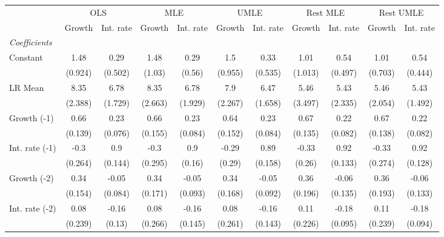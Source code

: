 \begin{table}[htbp] 
	\centering
	\begin{tabular}{@{\extracolsep{4pt}}lcccccccccc@{}}		\hline\hline
		 		 & \multicolumn{2}{c}{OLS} &\multicolumn{2}{c}{MLE} &\multicolumn{2}{c}{UMLE} &\multicolumn{2}{c}{Rest MLE} &\multicolumn{2}{c}{Rest UMLE} \\ 
 		 & Growth 	 & Int. rate 	 & Growth 	 & Int. rate 	 & Growth 	 & Int. rate 	 & Growth 	 & Int. rate 	 & Growth 	 & Int. rate\\\cline{2-3}\cline{4-5}\cline{6-7}\cline{8-9}\cline{10-11}
\rule{0pt}{4ex} 
 \emph{Coefficients} 	  		 & 		 & 		 & 		 & 		 & 		 & 		 & 		 & 		 & 		 &\\ 
\quad Constant 	 & 1.48 	 & 0.29 	 & 1.48 	 & 0.29 	 & 1.5 	 & 0.33 	 & 1.01 	 & 0.54 	 & 1.01 	 & 0.54	 \\ 
 		 & (0.924) 	 & (0.502) 	 & (1.03) 	 & (0.56) 	 & (0.955) 	 & (0.535) 	 & (1.013) 	 & (0.497) 	 & (0.703) 	 & (0.444) 	 \\ 
\quad LR Mean 	 & 8.35 	 & 6.78 	 & 8.35 	 & 6.78 	 & 7.9 	 & 6.47 	 & 5.46 	 & 5.43 	 & 5.46 	 & 5.43	 \\ 
 		 & (2.388) 	 & (1.729) 	 & (2.663) 	 & (1.929) 	 & (2.267) 	 & (1.658) 	 & (3.497) 	 & (2.335) 	 & (2.054) 	 & (1.492) 	 \\ 
\quad Growth (-1) 	 &0.66 	 & 0.23 	 & 0.66 	 & 0.23 	 & 0.64 	 & 0.23 	 & 0.67 	 & 0.22 	 & 0.67 	 & 0.22	 \\ 
 		 & (0.139) 	 & (0.076) 	 & (0.155) 	 & (0.084) 	 & (0.152) 	 & (0.084) 	 & (0.135) 	 & (0.082) 	 & (0.138) 	 & (0.082) 	 \\ 
\quad Int. rate (-1) 	 &-0.3 	 & 0.9 	 & -0.3 	 & 0.9 	 & -0.29 	 & 0.89 	 & -0.33 	 & 0.92 	 & -0.33 	 & 0.92	 \\ 
 		 & (0.264) 	 & (0.144) 	 & (0.295) 	 & (0.16) 	 & (0.29) 	 & (0.158) 	 & (0.26) 	 & (0.133) 	 & (0.274) 	 & (0.128) 	 \\ 
\quad Growth (-2) 	 &0.34 	 & -0.05 	 & 0.34 	 & -0.05 	 & 0.34 	 & -0.05 	 & 0.36 	 & -0.06 	 & 0.36 	 & -0.06	 \\ 
 		 & (0.154) 	 & (0.084) 	 & (0.171) 	 & (0.093) 	 & (0.168) 	 & (0.092) 	 & (0.196) 	 & (0.135) 	 & (0.193) 	 & (0.133) 	 \\ 
\quad Int. rate (-2) 	 &0.08 	 & -0.16 	 & 0.08 	 & -0.16 	 & 0.08 	 & -0.16 	 & 0.11 	 & -0.18 	 & 0.11 	 & -0.18	 \\ 
 		 & (0.239) 	 & (0.13) 	 & (0.266) 	 & (0.145) 	 & (0.261) 	 & (0.143) 	 & (0.226) 	 & (0.095) 	 & (0.239) 	 & (0.094) 	 \\ 

\end{tabular}
\end{table}
